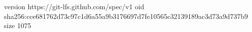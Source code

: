 version https://git-lfs.github.com/spec/v1
oid sha256:cce681762d73c97c1d6a55a9b3176697d7fe10565c32139189ac3d73a9d737b9
size 1075

